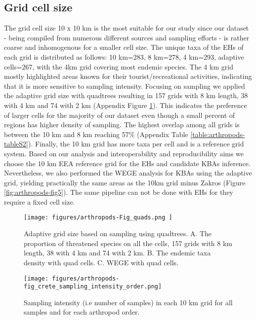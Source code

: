     \subsection{Grid cell size}
    \label{subsec:arthropods-grids}
The grid cell size 10 x 10 km is the most suitable for our study since our
dataset - being compiled from numerous different sources and sampling efforts -
is rather coarse and inhomogenous for a smaller cell size.
The unique taxa of the EHs of each grid is distributed as follows: 10 km=283,
8 km=278, 4 km=293, adaptive cells=267, with the 4km grid covering most endemic
species. The 4 km grid mostly highlighted areas known for their tourist/recreational activities,
indicating that it is more sensitive to sampling intensity.
Focusing on sampling we applied the adaptive grid size with quadtrees resulting
in 157 grids with 8 km length, 38 with 4 km and 74 with 2 km (Appendix Figure \ref{fig:arthropods-figS5}).
This indicates the preference of larger cells for the majority of our dataset
even though a small percent of regions has higher density of sampling.
The highest overlap among all grids is between the 10 km and 8 km reaching
57\% (Appendix Table \ref{table:arthropods-tableS2}). Finally, the 10 km grid has more taxa
per cell and is a reference grid system.
Based on our analysis and interoperability and reproducibility aims we choose
the 10 km EEA reference grid for the EHs and candidate KBAs inference.
Nevertheless, we also performed the WEGE analysis for KBAs using the adaptive
grid, yielding practically the same areas as the 10km grid minus Zakros (Figure \ref{fig:arthropods-fig5}).
The same pipeline can not be done with EHs for they require a fixed cell size.

   \begin{figure}[ht]
      \centering
      \texttt{[image: figures/arthropods-Fig\_quads.png ]}
      \caption[Adaptive grid size based on sampling using quadtrees]{Adaptive grid size based on sampling using quadtrees. A. The proportion of threatened species on all the cells, 157 grids with 8 km length, 38 with 4 km and 74 with 2 km. B. The endemic taxa density with quad cells. C. WEGE with quad cells.}
      \label{fig:arthropods-figS5}
   \end{figure}

   \begin{figure}[ht]
      \centering
      \texttt{[image: figures/arthropods-fig\_crete\_sampling\_intensity\_order.png]}
      \caption[Sampling intensity for every order]{Sampling intensity (i.e number of samples) in each 10 km grid for all samples and for each arthropod order.}
      \label{fig:arthropods-figS7}
   \end{figure}


